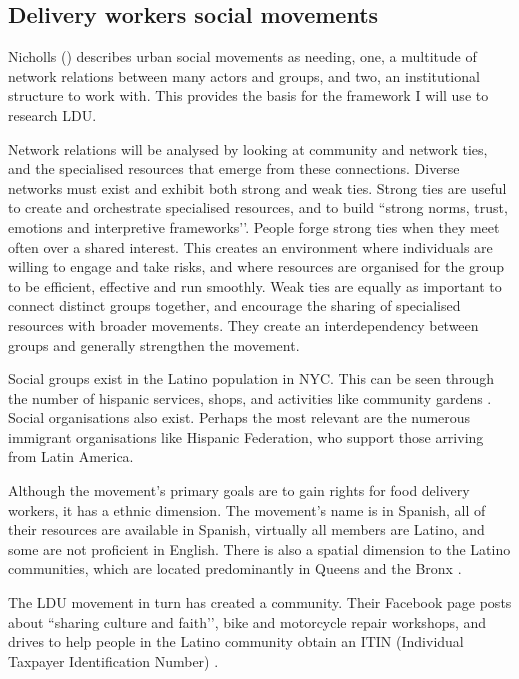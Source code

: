 \documentclass{article}
\begin{document}
\subsection{Delivery workers social movements}

Nicholls (\citeyear{nicholls2008urban}) describes urban social movements as needing, one, a multitude of network relations between many actors and groups, and two, an institutional structure to work with.
This provides the basis for the framework I will use to research LDU. 

Network relations will be analysed by looking at community and network ties, and the specialised resources that emerge from these connections.
Diverse networks must exist and exhibit both strong and weak ties. Strong ties are useful to create and orchestrate specialised resources, and to build ``strong norms, trust, emotions and interpretive frameworks’’\parencite{nicholls2008urban}. People forge strong ties when they meet often over a shared interest. This creates an environment where individuals are willing to engage and take risks, and where resources are organised for the group to be efficient, effective and run smoothly. 
Weak ties are equally as important to connect distinct groups together, and encourage the sharing of specialised resources with broader movements. They create an interdependency between groups and generally strengthen the movement.

Social groups exist in the Latino population in NYC. This can be seen through the number of hispanic services, shops, and activities like community gardens \parencite{saldivar2004culturing}. Social organisations also exist. Perhaps the most relevant are the numerous immigrant organisations like Hispanic Federation, who support those arriving from Latin America. 

Although the movement’s primary goals are to gain rights for food delivery workers, it has a ethnic dimension. The movement’s name is in Spanish, all of their resources are available in Spanish, virtually all members are Latino, and some are not proficient in English. There is also a spatial dimension to the Latino communities, which are located predominantly in Queens and the Bronx \parencite{nycimmigrantpopulation2021}. 

The LDU movement in turn has created a community. Their Facebook page posts about ``sharing culture and faith’’, bike and motorcycle repair workshops, and drives to help people in the Latino community obtain an ITIN (Individual Taxpayer Identification Number) \parencite{facebookldu}.
\end{document}
